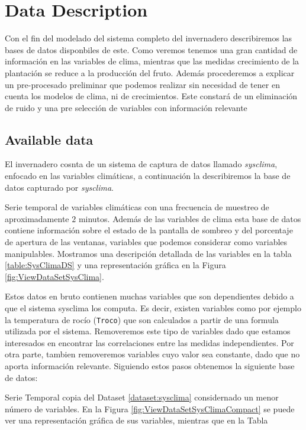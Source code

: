 \chapter{Data Description}


Con el fin del modelado del sistema completo del invernadero describiremos las bases de datos disponbiles de este. Como veremos tenemos una gran cantidad de información en las variables de clima, mientras que las medidas  crecimiento de la plantación se reduce a la producción del fruto. Además procederemos a explicar un pre-procesado preliminar que podemos realizar sin necesidad de tener en cuenta los modelos de clima, ni de crecimientos. Este constará de un eliminación de ruido y una pre selección de variables con información relevante

\section{Available data}


El invernadero cosnta de un sistema de captura de datos llamado \emph{sysclima}, enfocado en las variables climáticas, a continuación la describiremos la base de datos capturado por \emph{sysclima}. 

\begin{dataset}[SysClima]\label{dataset:sysclima}
Serie temporal de variables climáticas con una frecuencia de muestreo de aproximadamente $2$ minutos. Además de las variables de clima esta base de datos contiene información sobre el estado de la pantalla de sombreo y del porcentaje de apertura de las ventanas, variables que podemos considerar como variables manipulables. Mostramos una descripción detallada de las variables en la tabla \ref{table:SysClimaDS} y una representación gráfica en la Figura \ref{fig:ViewDataSetSysClima}.
\end{dataset}

Estos datos en bruto contienen muchas variables que son dependientes debido a que el sistema sysclima los computa. Es decir, existen variables como por ejemplo la temperatura de rocío (\texttt{Troco}) que son calculados a partir de una formula utilizada por el sistema. Removeremos este tipo de variables dado que estamos interesados en encontrar las correlaciones entre las medidas independientes. Por otra parte, tambien removeremos variables cuyo valor sea constante, dado que no aporta información relevante. Siguiendo estos pasos obtenemos la siguiente base de datos:

\begin{dataset}\label{dataset:sysclima2}
    Serie Temporal copia del Dataset \ref{dataset:sysclima} considernado un menor número de variables. En la Figura  \ref{fig:ViewDataSetSysClimaCompact} se puede ver una representación gráfica de sus variables, mientras que en la Tabla
\end{dataset}

